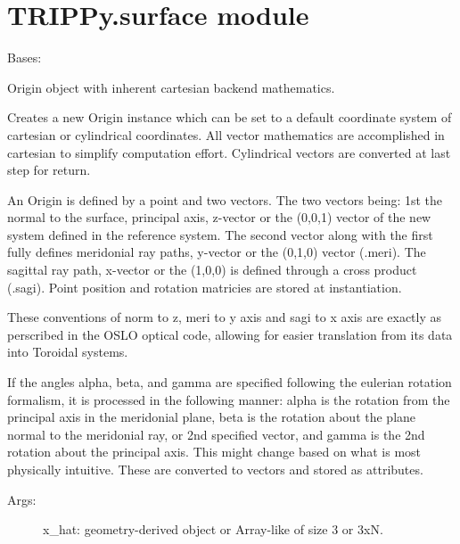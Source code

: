 \documentclass[letterpaper,10pt,english]{sphinxmanual}
\begin{document}
\chapter{TRIPPy.surface module}
\label{TRIPPy:trippy-surface-module}\label{TRIPPy:module-TRIPPy.surface}

\begin{fulllineitems}
\label{TRIPPy:TRIPPy.surface.Circle}
Bases: {\hyperref[TRIPPy:TRIPPy.surface.Ellipse]{}}

Origin object with inherent cartesian backend mathematics.

Creates a new Origin instance which can be set to a default 
coordinate system of cartesian or cylindrical coordinates.
All vector mathematics are accomplished in cartesian to 
simplify computation effort. Cylindrical vectors are
converted at last step for return.

An Origin is defined by a point and two vectors. The two 
vectors being: 1st the normal to the surface, principal axis,
z-vector or the (0,0,1) vector of the new system defined in
the reference system. The second vector along with the 
first fully defines meridonial ray paths, y-vector or the
(0,1,0) vector (.meri). The sagittal ray path, x-vector or
the (1,0,0) is defined through a cross product (.sagi).
Point position and rotation matricies are stored at
instantiation.

These conventions of norm to z, meri to y axis and sagi to
x axis are exactly as perscribed in the OSLO optical code,
allowing for easier translation from its data into Toroidal
systems.

If the angles alpha, beta, and gamma are specified following
the eulerian rotation formalism, it is processed in the 
following manner: alpha is the rotation from the principal
axis in the meridonial plane, beta is the rotation about the
plane normal to the meridonial ray, or 2nd specified vector,
and gamma is the 2nd rotation about the principal axis. 
This might change based on what is most physically intuitive.
These are converted to vectors and stored as attributes.
\begin{description}
\item[{Args:}] \leavevmode
x\_hat: geometry-derived object or Array-like of size 3 or 3xN.


\end{description}
\end{fulllineitems}
\end{document}
